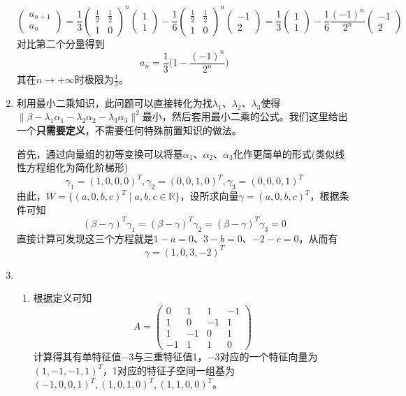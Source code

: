 \documentclass[a4paper,UTF8,fontset=windows,AutoFakeBold]{ctexart}
\begin{document}
\begin{enumerate}
    $$\begin{pmatrix}a_{n+1}\\a_n\end{pmatrix}=\frac{1}{3}\begin{pmatrix}\frac{1}{2}&\frac{1}{2}\\1&0\end{pmatrix}^n\begin{pmatrix}1\\1\end{pmatrix}-\frac{1}{6}\begin{pmatrix}\frac{1}{2}&\frac{1}{2}\\1&0\end{pmatrix}^n\begin{pmatrix}-1\\2\end{pmatrix}=\frac{1}{3}\begin{pmatrix}1\\1\end{pmatrix}-\frac{1}{6}\frac{(-1)^n}{2^n}\begin{pmatrix}-1\\2\end{pmatrix}$$
    对比第二个分量得到
    $$a_n=\frac{1}{3}\bigg(1-\frac{(-1)^n}{2^n}\bigg)$$
    其在$n\to+\infty$时极限为$\frac{1}{3}$。

    \item
    利用最小二乘知识，此问题可以直接转化为找$\lambda_1$、$\lambda_2$、$\lambda_3$使得$\|\beta-\lambda_1\alpha_1-\lambda_2\alpha_2-\lambda_3\alpha_3\|^2$最小，然后套用最小二乘的公式。我们这里给出一个\textbf{只需要定义}，不需要任何特殊前置知识的做法。
    
    首先，通过向量组的初等变换可以将基$\alpha_1$、$\alpha_2$、$\alpha_3$化作更简单的形式(类似线性方程组化为简化阶梯形)
    $$\gamma_1=(1,0,0,0)^T,\gamma_2=(0,0,1,0)^T,\gamma_3=(0,0,0,1)^T$$
    由此，$W=\{(a,0,b,c)^T\mid a,b,c\in\mathbb{R}\}$，设所求向量$\gamma=(a,0,b,c)^T$，根据条件可知
    $$(\beta-\gamma)^T\gamma_1=(\beta-\gamma)^T\gamma_2=(\beta-\gamma)^T\gamma_3=0$$
    直接计算可发现这三个方程就是$1-a=0$、$3-b=0$、$-2-c=0$，从而有
    $$\gamma=(1,0,3,-2)^T$$

    \item
    \begin{enumerate}
        \item 根据定义可知
        $$A=\begin{pmatrix}0&1&1&-1\\1&0&-1&1\\1&-1&0&1\\-1&1&1&0\end{pmatrix}$$
        计算得其有单特征值$-3$与三重特征值1，$-3$对应的一个特征向量为$(1,-1,-1,1)^T$，1对应的特征子空间一组基为$(-1,0,0,1)^T,(1,0,1,0)^T,(1,1,0,0)^T$。


\end{enumerate}
\end{enumerate}
\end{document}
